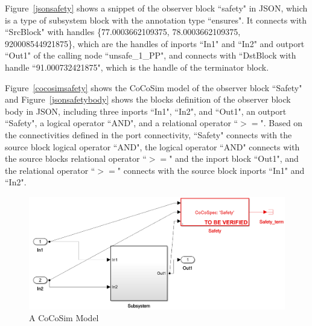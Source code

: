 \documentclass{article}
\begin{document}
Figure~\ref{jsonsafety} shows a snippet of the observer block ``safety" in JSON, which is a type of subsystem block with the annotation type ``ensures".
It connects with ``SrcBlock" with handles \{77.0003662109375, 78.0003662109375, 920008544921875\}, which are the handles of inports ``In1" and ``In2" and outport ``Out1" of the calling node ``unsafe\_1\_PP",  and connects with ``DstBlock with handle ``91.000732421875", which is the handle of the terminator block. 

Figure~\ref{cocosimsafety} shows the CoCoSim model of the observer block ``Safety" and Figure~\ref{jsonsafetybody} shows the blocks definition of the observer block body in JSON, including 
three inports ``In1", ``In2", and ``Out1", an outport ``Safety", a logical operator ``AND", and a relational operator ``$>=$". 
Based on the connectivities defined in the port connectivity, ``Safety" connects with the source block logical operator ``AND", the logical operator ``AND" connects with the source blocks relational operator ``$>=$" and the inport block ``Out1", and the relational operator ``$>=$" connects
with the source block inports ``In1" and ``In2". 

\begin{figure}[h]
\begin{center}
    \includegraphics[scale=0.25]{figures/safety000}
\end{center}  
  \caption{A CoCoSim Model}
  \label{cocosimmodel}
\end{figure}
\end{document}
